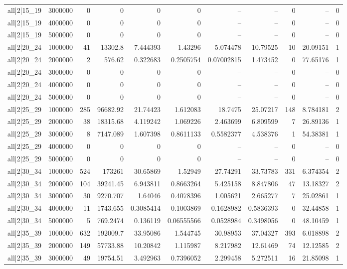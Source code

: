 \begin{tabular}{lrrrrrrrrrr}
all|2|15\_19 & 3000000 & 0 & 0 & 0 & 0 & -- & -- & 0 & -- & 0 \\
all|2|15\_19 & 4000000 & 0 & 0 & 0 & 0 & -- & -- & 0 & -- & 0 \\
all|2|15\_19 & 5000000 & 0 & 0 & 0 & 0 & -- & -- & 0 & -- & 0 \\
all|2|20\_24 & 1000000 & 41 & 13302.8 & 7.444393 & 1.43296 & 5.074478 & 10.79525 & 10 & 20.09151 & 1 \\
all|2|20\_24 & 2000000 & 2 & 576.62 & 0.322683 & 0.2505754 & 0.07002815 & 1.473452 & 0 & 77.65176 & 1 \\
all|2|20\_24 & 3000000 & 0 & 0 & 0 & 0 & -- & -- & 0 & -- & 0 \\
all|2|20\_24 & 4000000 & 0 & 0 & 0 & 0 & -- & -- & 0 & -- & 0 \\
all|2|20\_24 & 5000000 & 0 & 0 & 0 & 0 & -- & -- & 0 & -- & 0 \\
all|2|25\_29 & 1000000 & 285 & 96682.92 & 21.74423 & 1.612083 & 18.7475 & 25.07217 & 148 & 8.784181 & 2 \\
all|2|25\_29 & 2000000 & 38 & 18315.68 & 4.119242 & 1.069226 & 2.463699 & 6.809599 & 7 & 26.89136 & 1 \\
all|2|25\_29 & 3000000 & 8 & 7147.089 & 1.607398 & 0.8611133 & 0.5582377 & 4.538376 & 1 & 54.38381 & 1 \\
all|2|25\_29 & 4000000 & 0 & 0 & 0 & 0 & -- & -- & 0 & -- & 0 \\
all|2|25\_29 & 5000000 & 0 & 0 & 0 & 0 & -- & -- & 0 & -- & 0 \\
all|2|30\_34 & 1000000 & 524 & 173261 & 30.65869 & 1.52949 & 27.74291 & 33.73783 & 331 & 6.374354 & 2 \\
all|2|30\_34 & 2000000 & 104 & 39241.45 & 6.943811 & 0.8663264 & 5.425158 & 8.847806 & 47 & 13.18327 & 2 \\
all|2|30\_34 & 3000000 & 30 & 9270.707 & 1.64046 & 0.4078396 & 1.005621 & 2.665277 & 7 & 25.02861 & 1 \\
all|2|30\_34 & 4000000 & 11 & 1743.655 & 0.3085414 & 0.1003869 & 0.1628982 & 0.5836393 & 0 & 32.44858 & 1 \\
all|2|30\_34 & 5000000 & 5 & 769.2474 & 0.136119 & 0.06555566 & 0.0528984 & 0.3498056 & 0 & 48.10459 & 1 \\
all|2|35\_39 & 1000000 & 632 & 192009.7 & 33.95086 & 1.544745 & 30.98953 & 37.04327 & 393 & 6.018898 & 2 \\
all|2|35\_39 & 2000000 & 149 & 57733.88 & 10.20842 & 1.115987 & 8.217982 & 12.61469 & 74 & 12.12585 & 2 \\
all|2|35\_39 & 3000000 & 49 & 19754.51 & 3.492963 & 0.7396052 & 2.299458 & 5.272511 & 16 & 21.85098 & 1 \\

\end{tabular}
